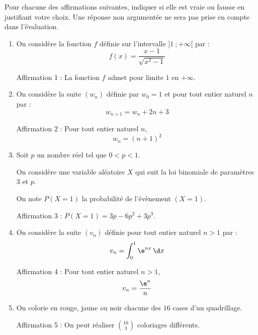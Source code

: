 Pour chacune des affirmations suivantes, indiquer si elle est vraie ou fausse en justifiant votre choix.
Une réponse non argumentée ne sera pas prise en compte dans l'évaluation.

\begin{enumerate}
\item On considère la fonction $f$ définie sur l'intervalle $]1~;+\infty[$ par :
\[
f(x)=\dfrac{x-1}{\sqrt{x^2-1}}
\]

Affirmation 1 : La fonction $f$ admet pour limite $1$ en $+\infty$.

\item On considère la suite $\left(w_n\right)$ définie par $w_0 = 1$ et pour tout entier naturel $n$ par :
\[
w_{n+1}=w_n+2n+3
\]

Affirmation 2 : Pour tout entier naturel $n$,
\[
w_n=(n+1)^2
\]

\item Soit $p$ un nombre réel tel que $0 < p < 1$.

On considère une variable aléatoire $X$ qui suit la loi binomiale de paramètres $3$ et $p$.

On note $P\left(X=1\right)$ la probabilité de l'évènement $(X=1)$.

Affirmation 3 : $P\left(X=1\right)=3p-6p^2+3p^3$.

\item On considère la suite $\left(v_n\right)$ définie pour tout entier naturel $n > 1$ par :
\[
v_n=\int_0^1 \e^{nx}\,\d x
\]

Affirmation 4 : Pour tout entier naturel $n > 1$,
\[
v_n=\dfrac{\e^n}{n}
\]

\item On colorie en rouge, jaune ou noir chacune des $16$ cases d'un quadrillage.

Affirmation 5 : On peut réaliser $\binom{16}{3}$ coloriages différents.
\end{enumerate}
